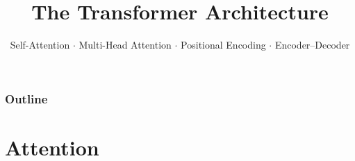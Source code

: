 \documentclass[aspectratio=169]{beamer}
\title{The Transformer Architecture}
\subtitle{Self-Attention $\cdot$ Multi-Head Attention $\cdot$ Positional Encoding $\cdot$ Encoder--Decoder}
\date{}
\begin{document}
\begin{frame}
\titlepage
\end{frame}

\begin{frame}
\frametitle{Outline}
\tableofcontents
\end{frame}

\section{Attention}
\end{document}
